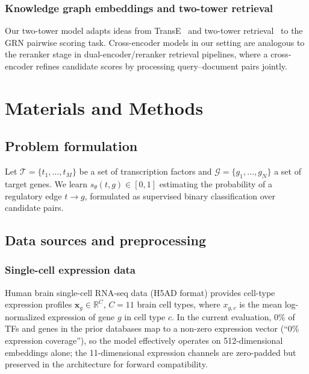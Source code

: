 \documentclass[10pt,twocolumn]{article}
\begin{document}
\subsubsection{Knowledge graph embeddings and two-tower retrieval}
Our two-tower model adapts ideas from TransE~\cite{bordes2013translating} and
two-tower retrieval~\cite{yi2019sampling} to the GRN pairwise scoring task.
Cross-encoder models in our setting are analogous to the reranker stage in
dual-encoder/reranker retrieval pipelines, where a cross-encoder refines
candidate scores by processing query--document pairs jointly.

\section{Materials and Methods}
\label{sec:methods}

\subsection{Problem formulation}
\label{sec:problem}

Let $\mathcal{T} = \{t_1, \ldots, t_M\}$ be a set of transcription factors
and $\mathcal{G} = \{g_1, \ldots, g_N\}$ a set of target genes.
We learn $s_\theta(t, g) \in [0, 1]$ estimating the probability of a regulatory
edge $t \to g$, formulated as supervised binary classification over candidate pairs.

\subsection{Data sources and preprocessing}
\label{sec:data}

\subsubsection{Single-cell expression data}
Human brain single-cell RNA-seq data (H5AD format) provides cell-type expression
profiles $\mathbf{x}_g \in \mathbb{R}^{C}$, $C = 11$ brain cell types, where
$x_{g,c}$ is the mean log-normalized expression of gene $g$ in cell type $c$.
In the current evaluation, 0\% of TFs and genes in the prior databases map to
a non-zero expression vector (``0\% expression coverage''), so the model
effectively operates on 512-dimensional embeddings alone; the 11-dimensional
expression channels are zero-padded but preserved in the architecture for
forward compatibility.
\end{document}
